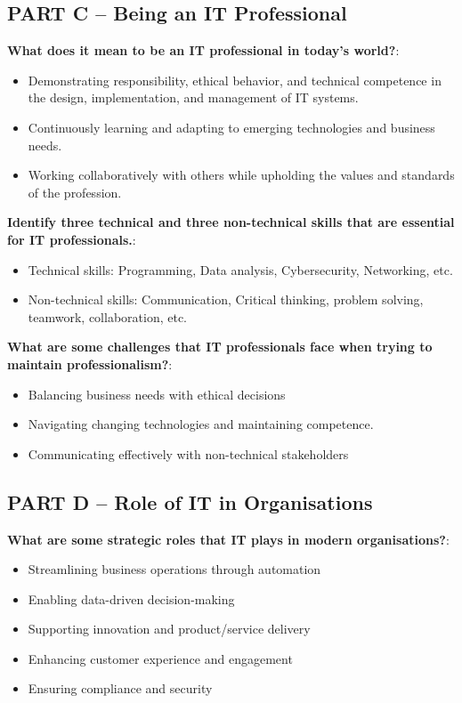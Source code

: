 \subsection{PART C – Being an IT Professional}

\noindent\textbf{What does it mean to be an IT professional in today’s world?}: 

\begin{itemize}
    \item Demonstrating responsibility, ethical behavior, and technical competence in the design, implementation, and management of IT systems. 
    \item Continuously learning and adapting to emerging technologies and business needs.
    \item Working collaboratively with others while upholding the values and standards of the profession.
\end{itemize}

\noindent\textbf{Identify three technical and three non-technical skills that are essential for IT professionals.}: 

\begin{itemize}
    \item Technical skills: Programming, Data analysis, Cybersecurity, Networking, etc.
    \item Non-technical skills: Communication, Critical thinking, problem solving, teamwork, collaboration, etc.
\end{itemize}


\noindent\textbf{What are some challenges that IT professionals face when trying to maintain professionalism?}: 

\begin{itemize}
    \item Balancing business needs with ethical decisions
    \item Navigating changing technologies and maintaining competence.
    \item Communicating effectively with non-technical stakeholders
\end{itemize}

\subsection{PART D – Role of IT in Organisations}

\noindent\textbf{What are some strategic roles that IT plays in modern organisations?}: 

\begin{itemize}
    \item Streamlining business operations through automation
    \item Enabling data-driven decision-making
    \item Supporting innovation and product/service delivery
    \item Enhancing customer experience and engagement
    \item Ensuring compliance and security
\end{itemize}


